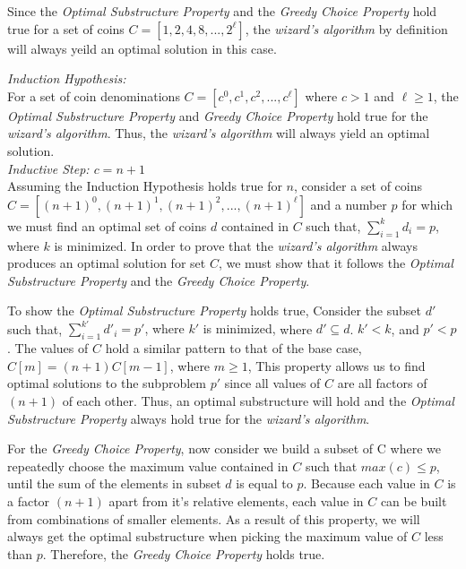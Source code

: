 \documentclass[12pt]{article}
\begin{document}
\begin{enumerate}
\begin{enumerate}
{		Since the \emph{Optimal Substructure Property} and the \emph{Greedy Choice Property} hold true for a set of coins $C = [1, 2, 4, 8, ... , 2^\ell]$, the \emph{wizard's algorithm} by definition will always yeild an optimal solution in this case.\newpage

		\emph{Induction Hypothesis:}\\
		For a set of coin denominations $C = [c^0, c^1, c^2, ... , c^\ell]$ where $c > 1$ and $\ell \geq 1$, the \emph{Optimal Substructure Property} and \emph{Greedy Choice Property} hold true for the \emph{wizard's algorithm}. Thus, the \emph{wizard's algorithm} will always yield an optimal solution.\\

		\emph{Inductive Step: $c = n + 1$}\\
		Assuming the Induction Hypothesis holds true for $n$, consider a set of coins $C = [(n+1)^0, (n+1)^1, (n+1)^2, ... , (n+1)^\ell]$ and a number $p$ for which we must find an optimal set of coins $d$ contained in $C$ such that,
		{\center $\sum_{i = 1}^{k} d_{i} = p$, where $k$ is minimized. \endcenter}
		In order to prove that the \emph{wizard's algorithm} always produces an optimal solution for set $C$, we must show that it follows the \emph{Optimal Substructure Property} and the \emph{Greedy Choice Property}.

		To show  the \emph{Optimal Substructure Property} holds true,  Consider the subset $d'$ such that,
		{\center $\sum_{i = 1}^{k'} d'_{i} = p'$, where $k'$ is minimized, \endcenter}
		where $ d' \subseteq d$. $k' < k$, and $p' < p$. The values of $C$ hold a similar pattern to that of the base case,
		{\center $C[m] = (n+1)C[m-1]$, where $m \geq 1$, \endcenter}
		This property allows us to find optimal solutions to the subproblem $p'$ since all values of $C$ are all factors of $(n+1)$ of each other. Thus, an optimal substructure will hold and the \emph{Optimal Substructure Property} always hold true for the \emph{wizard's algorithm}.

		For the \emph{Greedy Choice Property}, now consider we build a subset of C where we repeatedly choose the maximum value contained in $C$ such that
		{\center $max(c) \leq p$,\endcenter}
		until the sum of the elements in subset $d$ is equal to $p$. Because each value in $C$ is a factor $(n+1)$ apart from it's relative elements, each value in $C$ can be built from combinations of smaller elements. As a result of this property, we will always get the optimal substructure when picking the maximum value of $C$ less than $p$. Therefore, the \emph{Greedy Choice Property} holds true.

}
\end{enumerate}
\end{enumerate}
\end{document}
